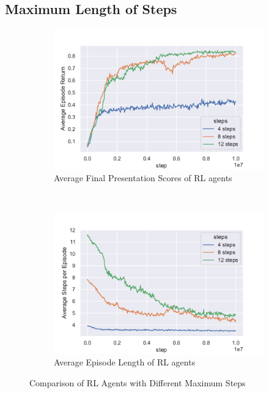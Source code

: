 \documentclass[letterpaper]{article}
\begin{document}
\subsection{Maximum Length of Steps}
\label{sec:dis:policy}

\begin{figure}
	\begin{subfigure}[b]{.48\linewidth}
		\centering
		\includegraphics[width=\linewidth]{plots/step_reward.pdf}
		\caption{Average Final Presentation Scores of RL agents}
		\label{fig:step:reward}
	\end{subfigure}
	~~
	\begin{subfigure}[b]{.48\linewidth}
		\centering
		\includegraphics[width=\linewidth]{plots/step_length.pdf}
		\caption{Average Episode Length of RL agents}
		\label{fig:step:length}
	\end{subfigure}
	\caption{Comparison of RL Agents with Different Maximum Steps}
	\label{fig:step}
\end{figure}
\end{document}

